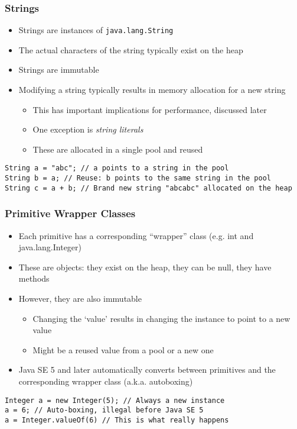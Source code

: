 \documentclass{beamer}
\begin{document}
\begin{frame}[fragile]
\frametitle{Strings}
\begin{itemize}
\item Strings are instances of \texttt{java.lang.String}
\item The actual characters of the string typically exist on the heap
\item Strings are immutable
\item Modifying a string typically results in memory allocation for a new string
\begin{itemize}
\item This has important implications for performance, discussed later
\item One exception is \emph{string literals}
\item These are allocated in a single pool and reused
\end{itemize}
\end{itemize}
\lstset{language=Java}
\begin{lstlisting}
String a = "abc"; // a points to a string in the pool
String b = a; // Reuse: b points to the same string in the pool
String c = a + b; // Brand new string "abcabc" allocated on the heap
\end{lstlisting}
\end{frame}

\begin{frame}[fragile]
\frametitle{Primitive Wrapper Classes}
\begin{itemize}
\item Each primitive has a corresponding ``wrapper'' class (e.g. int and java.lang.Integer)
\item These are objects: they exist on the heap, they can be null, they have methods
\item However, they are also immutable
\begin{itemize}
\item Changing the `value' results in changing the instance to point to a new value
\item Might be a reused value from a pool or a new one
\end{itemize}
\item Java SE 5 and later automatically converts between primitives and the corresponding wrapper class (a.k.a. autoboxing)
\end{itemize}
\lstset{language=Java}
\begin{lstlisting}
Integer a = new Integer(5); // Always a new instance
a = 6; // Auto-boxing, illegal before Java SE 5
a = Integer.valueOf(6) // This is what really happens
\end{lstlisting}
\end{frame}
\end{document}

